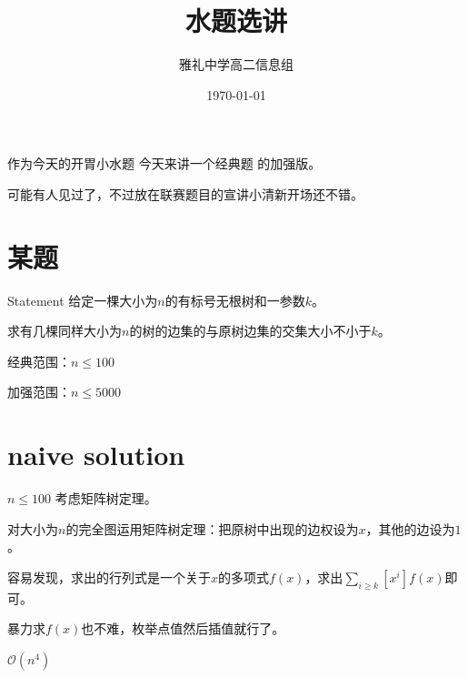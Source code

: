 \documentclass[9pt]{beamer}
\title{水题选讲}
\date{\today}
\author{雅礼中学高二信息组}
\begin{document}
  \maketitle
\begin{frame}{作为今天的开胃小水题}
	今天来讲一个经典题\pause
	的加强版。

	\pause
	可能有人见过了，不过放在联赛题目的宣讲小清新开场还不错。
\end{frame}
\section{某题}
\begin{frame}{Statement}
	给定一棵大小为$n$的有标号无根树和一参数$k$。
	
	求有几棵同样大小为$n$的树的边集的与原树边集的交集大小不小于$k$。

	经典范围：$n\le 100$

	加强范围：$n\le 5000$
\end{frame}
\section{naive solution}
\begin{frame}{$n\le 100$}
	考虑矩阵树定理。

	对大小为$n$的完全图运用矩阵树定理：把原树中出现的边权设为$x$，其他的边设为$1$。\pause

	容易发现，求出的行列式是一个关于$x$的多项式$f(x)$，求出$\sum_{i\geq k}[x^i]f(x)$即可。

	暴力求$f(x)$也不难，枚举点值然后插值就行了。\pause

	$\mathcal O(n^4)$
\end{frame}
\end{document}
